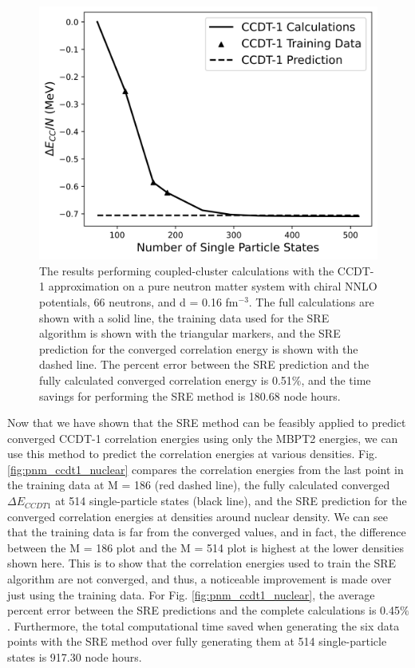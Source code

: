 \begin{figure}
    \centering
\includegraphics[scale=0.75]{Images/Chapter7/ORNL/CCDT1_Initial.png}
    \caption{The results performing coupled-cluster calculations with the CCDT-1 approximation on a pure neutron matter system with chiral NNLO potentials, 66 neutrons, and d = 0.16 fm$^{-3}$. The full calculations are shown with a solid line, the training data used for the SRE algorithm is shown with the triangular markers, and the SRE prediction for the converged correlation energy is shown with the dashed line. The percent error between the SRE prediction and the fully calculated converged correlation energy is 0.51$\%$, and the time savings for performing the SRE method is 180.68 node hours.}
    \label{fig:one_ccdt1_density}
\end{figure}

Now that we have shown that the SRE method can be feasibly applied to predict converged CCDT-1 correlation energies using only the MBPT2 energies, we can use this method to predict the correlation energies at various densities. Fig. \ref{fig:pnm_ccdt1_nuclear} compares the correlation energies from the last point in the training data at M = 186 (red dashed line), the fully calculated converged $\Delta E_{CCDT1}$ at 514 single-particle states (black line), and the SRE prediction for the converged correlation energies at densities around nuclear density. We can see that the training data is far from the converged values, and in fact, the difference between the M = 186 plot and the M = 514 plot is highest at the lower densities shown here. This is to show that the correlation energies used to train the SRE algorithm are not converged, and thus, a noticeable improvement is made over just using the training data. For Fig. \ref{fig:pnm_ccdt1_nuclear}, the average percent error between the SRE predictions and the complete calculations is 0.45$\%$. Furthermore, the total computational time saved when generating the six data points with the SRE method over fully generating them at 514 single-particle states is 917.30 node hours.

